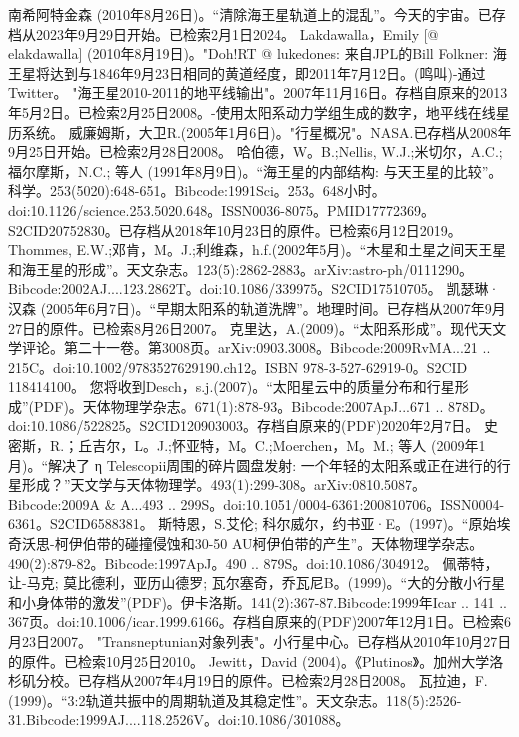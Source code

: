 \begin{enumerate}
 南希阿特金森 (2010年8月26日)。“清除海王星轨道上的混乱”。今天的宇宙。已存档从2023年9月29日开始。已检索2月1日2024。
 Lakdawalla，Emily [@ elakdawalla] (2010年8月19日)。"Doh!RT @ lukedones: 来自JPL的Bill Folkner: 海王星将达到与1846年9月23日相同的黄道经度，即2011年7月12日。(鸣叫)-通过Twitter。
 "海王星2010-2011的地平线输出"。2007年11月16日。存档自原来的2013年5月2日。已检索2月25日2008。-使用太阳系动力学组生成的数字，地平线在线星历系统。
 威廉姆斯，大卫R.(2005年1月6日)。"行星概况"。NASA.已存档从2008年9月25日开始。已检索2月28日2008。
 哈伯德，W。B.;Nellis, W.J.;米切尔，A.C.;福尔摩斯，N.C.; 等人 (1991年8月9日)。“海王星的内部结构: 与天王星的比较”。科学。253(5020):648-651。Bibcode:1991Sci。253。648小时。doi:10.1126/science.253.5020.648。ISSN0036-8075。PMID17772369。S2CID20752830。已存档从2018年10月23日的原件。已检索6月12日2019。   
 Thommes, E.W.;邓肯，M。J.;利维森，h.f.(2002年5月)。“木星和土星之间天王星和海王星的形成”。天文杂志。123(5):2862-2883。arXiv:astro-ph/0111290。Bibcode:2002AJ....123.2862T。doi:10.1086/339975。S2CID17510705。 
 凯瑟琳·汉森 (2005年6月7日)。“早期太阳系的轨道洗牌”。地理时间。已存档从2007年9月27日的原件。已检索8月26日2007。
 克里达，A.(2009)。“太阳系形成”。现代天文学评论。第二十一卷。第3008页。arXiv:0903.3008。Bibcode:2009RvMA...21 .. 215C。doi:10.1002/9783527629190.ch12。ISBN  978-3-527-62919-0。S2CID 118414100。
 您将收到Desch，s.j.(2007)。“太阳星云中的质量分布和行星形成”(PDF)。天体物理学杂志。671(1):878-93。Bibcode:2007ApJ...671 .. 878D。doi:10.1086/522825。S2CID120903003。存档自原来的(PDF)2020年2月7日。  
 史密斯，R.；丘吉尔，L。J.;怀亚特，M。C.;Moerchen，M。M.; 等人 (2009年1月)。“解决了 η Telescopii周围的碎片圆盘发射: 一个年轻的太阳系或正在进行的行星形成？”天文学与天体物理学。493(1):299-308。arXiv:0810.5087。Bibcode:2009A & A...493 .. 299S。doi:10.1051/0004-6361:200810706。ISSN0004-6361。S2CID6588381。  
 斯特恩，S.艾伦; 科尔威尔，约书亚·E。(1997)。“原始埃奇沃思-柯伊伯带的碰撞侵蚀和30-50 AU柯伊伯带的产生”。天体物理学杂志。490(2):879-82。Bibcode:1997ApJ。490 .. 879S。doi:10.1086/304912。
 佩蒂特，让-马克; 莫比德利，亚历山德罗; 瓦尔塞奇，乔瓦尼B。(1999)。“大的分散小行星和小身体带的激发”(PDF)。伊卡洛斯。141(2):367-87.Bibcode:1999年Icar .. 141 .. 367页。doi:10.1006/icar.1999.6166。存档自原来的(PDF)2007年12月1日。已检索6月23日2007。
 "Transneptunian对象列表"。小行星中心。已存档从2010年10月27日的原件。已检索10月25日2010。
 Jewitt，David (2004)。《Plutinos》。加州大学洛杉矶分校。已存档从2007年4月19日的原件。已检索2月28日2008。
 瓦拉迪，F.(1999)。“3:2轨道共振中的周期轨道及其稳定性”。天文杂志。118(5):2526-31.Bibcode:1999AJ....118.2526V。doi:10.1086/301088。

\end{enumerate}
